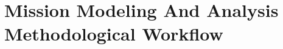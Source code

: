 



\section{Mission Modeling And Analysis Methodological Workflow}
\label{sec:mission_modeling_workflow}

